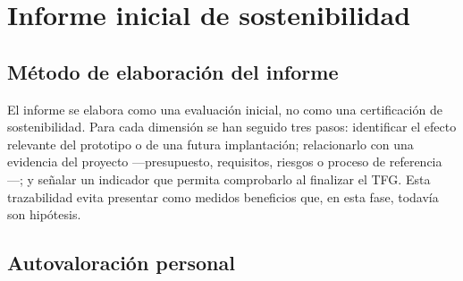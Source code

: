 
\chapter{Informe inicial de sostenibilidad}\label{sec:sost}

\section{Método de elaboración del informe}\label{sec:sost-1}

El informe se elabora como una evaluación inicial, no como una certificación de sostenibilidad. Para cada dimensión se han seguido tres pasos: identificar el efecto relevante del prototipo o de una futura implantación; relacionarlo con una evidencia del proyecto —presupuesto, requisitos, riesgos o proceso de referencia—; y señalar un indicador que permita comprobarlo al finalizar el TFG. Esta trazabilidad evita presentar como medidos beneficios que, en esta fase, todavía son hipótesis.

\section{Autovaloración personal}\label{sec:sost-2}

